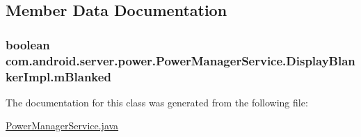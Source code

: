 \subsection{Member Data Documentation}
\hypertarget{classcom_1_1android_1_1server_1_1power_1_1PowerManagerService_1_1DisplayBlankerImpl_a2588920f9e1fca260ee7a4e4738c5bed}{
\subsubsection[{m\-Blanked}]{\setlength{\rightskip}{0pt plus 5cm}boolean com.\-android.\-server.\-power.\-Power\-Manager\-Service.\-Display\-Blanker\-Impl.\-m\-Blanked\hspace{0.3cm}{\ttfamily [private]}}}\label{classcom_1_1android_1_1server_1_1power_1_1PowerManagerService_1_1DisplayBlankerImpl_a2588920f9e1fca260ee7a4e4738c5bed}


The documentation for this class was generated from the following file\-:\begin{DoxyCompactItemize}
\item 
\hyperlink{PowerManagerService_8java}{Power\-Manager\-Service.\-java}\end{DoxyCompactItemize}
